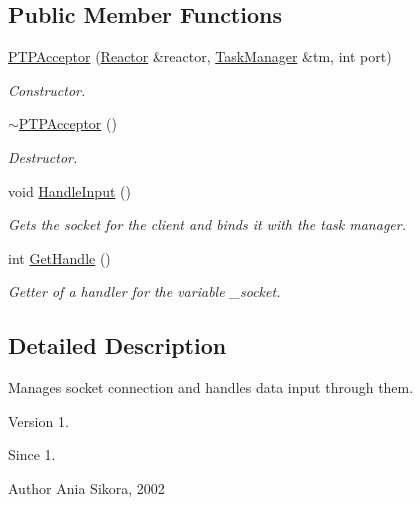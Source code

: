\subsection*{Public Member Functions}
\begin{DoxyCompactItemize}
\item 
\hyperlink{class_p_t_p_acceptor_a2886d7acd766d591b94b61063e4b6348}{P\-T\-P\-Acceptor} (\hyperlink{class_common_1_1_reactor}{Reactor} \&reactor, \hyperlink{class_task_manager}{Task\-Manager} \&tm, int port)
\begin{DoxyCompactList}\small\item\em Constructor. \end{DoxyCompactList}\item 
\hypertarget{class_p_t_p_acceptor_abfff4da1e33e6957e8a349bd8671a342}{\hyperlink{class_p_t_p_acceptor_abfff4da1e33e6957e8a349bd8671a342}{$\sim$\-P\-T\-P\-Acceptor} ()}\label{class_p_t_p_acceptor_abfff4da1e33e6957e8a349bd8671a342}

\begin{DoxyCompactList}\small\item\em Destructor. \end{DoxyCompactList}\item 
\hypertarget{class_p_t_p_acceptor_a3c280f3a20cd06fe94d72d6a715d9ebe}{void \hyperlink{class_p_t_p_acceptor_a3c280f3a20cd06fe94d72d6a715d9ebe}{Handle\-Input} ()}\label{class_p_t_p_acceptor_a3c280f3a20cd06fe94d72d6a715d9ebe}

\begin{DoxyCompactList}\small\item\em Gets the socket for the client and binds it with the task manager. \end{DoxyCompactList}\item 
int \hyperlink{class_p_t_p_acceptor_abbe21f4a532eb23a96ea696f7b344a32}{Get\-Handle} ()
\begin{DoxyCompactList}\small\item\em Getter of a handler for the variable \-\_\-socket. \end{DoxyCompactList}\end{DoxyCompactItemize}


\subsection{Detailed Description}
Manages socket connection and handles data input through them. 

\begin{DoxyVersion}{Version}
1. 
\end{DoxyVersion}
\begin{DoxySince}{Since}
1. 
\end{DoxySince}
\begin{DoxyAuthor}{Author}
Ania Sikora, 2002 
\end{DoxyAuthor}


